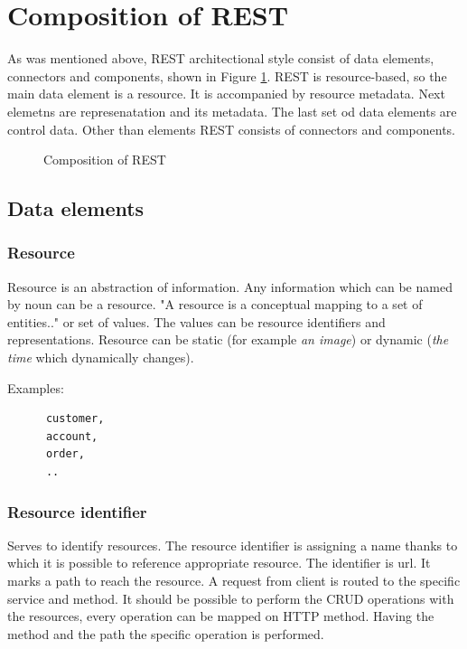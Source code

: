 \section{Composition of REST}
\label{sec:rest-composition}
As was mentioned above, REST architectional style consist of data elements, connectors and components, shown in Figure \ref{fig:composition-rest}. REST is resource-based, so the main data element is a resource. It is accompanied by resource metadata. Next elemetns are represenatation and its metadata. The last set od data elements are control data. Other than elements REST consists of connectors and components.

\begin{figure}[htp] 
\caption{Composition of REST}
\label{fig:composition-rest}
\end{figure} 

\subsection{Data elements}
\subsubsection{Resource}
  Resource is an abstraction of information. Any information which can be named by noun can be a resource. "A resource is a conceptual mapping to a set of entities.." \cite{fielding} or set of values. The values can be resource identifiers and representations.
  Resource can be static (for example \emph{an image}) or dynamic (\emph{the time} which dynamically changes).
  
  Examples:
  \begin{center} 
  \begin{lstlisting}
      customer, 
      account, 
      order, 
      ..
  \end{lstlisting} 
  \end{center}

\subsubsection{Resource identifier}
  Serves to identify resources. The resource identifier is assigning a name thanks to which it is possible to reference appropriate resource. The identifier is \gls{url}. It marks a path to reach the resource. A request from client is routed to the specific service and method.
It should be possible to perform the \gls{CRUD} operations with the resources, every operation can be mapped on HTTP method. Having the method and the path the specific operation is performed.

